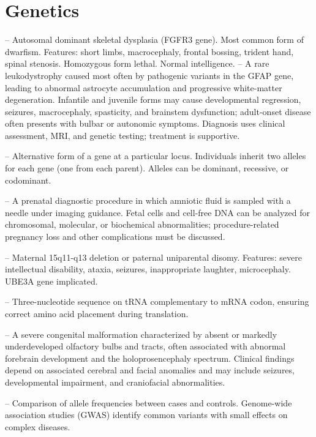 \chapter{Genetics}

-- Autosomal dominant skeletal dysplasia (FGFR3 gene). Most common form of dwarfism. Features: short limbs, macrocephaly, frontal bossing, trident hand, spinal stenosis. Homozygous form lethal. Normal intelligence.
-- A rare leukodystrophy caused most often by pathogenic variants in the GFAP gene, leading to abnormal astrocyte accumulation and progressive white-matter degeneration. Infantile and juvenile forms may cause developmental regression, seizures, macrocephaly, spasticity, and brainstem dysfunction; adult-onset disease often presents with bulbar or autonomic symptoms. Diagnosis uses clinical assessment, MRI, and genetic testing; treatment is supportive.

-- Alternative form of a gene at a particular locus. Individuals inherit two alleles for each gene (one from each parent). Alleles can be dominant, recessive, or codominant.

-- A prenatal diagnostic procedure in which amniotic fluid is sampled with a needle under imaging guidance. Fetal cells and cell-free DNA can be analyzed for chromosomal, molecular, or biochemical abnormalities; procedure-related pregnancy loss and other complications must be discussed.

-- Maternal 15q11-q13 deletion or paternal uniparental disomy. Features: severe intellectual disability, ataxia, seizures, inappropriate laughter, microcephaly. UBE3A gene implicated.

-- Three-nucleotide sequence on tRNA complementary to mRNA codon, ensuring correct amino acid placement during translation.

-- A severe congenital malformation characterized by absent or markedly underdeveloped olfactory bulbs and tracts, often associated with abnormal forebrain development and the holoprosencephaly spectrum. Clinical findings depend on associated cerebral and facial anomalies and may include seizures, developmental impairment, and craniofacial abnormalities.

-- Comparison of allele frequencies between cases and controls. Genome-wide association studies (GWAS) identify common variants with small effects on complex diseases.


